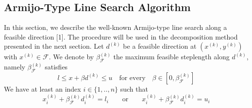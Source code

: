 \subsection{Armijo-Type Line Search Algorithm}
In this section, we describe the well-known Armijo-type line search along a feasible direction [1]. The procedure will be used in the decomposition method presented in the next section. Let $d^{(k)}$ be a feasible direction at $(x^{(k)}, y^{(k)})$ with $x^{(k)} \in \mathcal{F}$. We denote by $\beta_{\mathcal{F}}^{(k)}$ the maximum feasible steplength along $d^{(k)}$, namely $\beta_{\mathcal{F}}^{(k)}$ satisfies
\begin{equation*}
l \leq x + \beta d^{(k)} \leq u \quad \text{for every} \quad \beta \in [ 0, \beta_{\mathcal{F}}^{(k)} ]
\end{equation*}
We have at least an index $i \in \{1, .., n\}$ such that
\begin{equation*}
x_i^{(k)} + \beta_{\mathcal{F}}^{(k)} d_i^{(k)} = l_i \qquad \text{or} \qquad x_i^{(k)} + \beta_{\mathcal{F}}^{(k)} d_i^{(k)} = u_i 
\end{equation*}